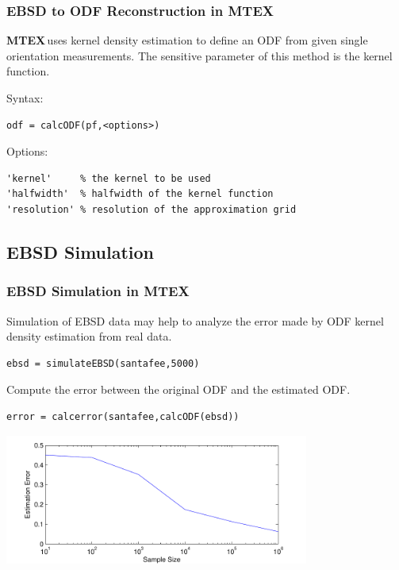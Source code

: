 \documentclass{beamer}
\newcommand{\mtex}{{\large \bf{\color{red}M}TEX\,}}%
\newcommand{\MTEX}{{\bf {\color{red}M}TEX\,}}%
\begin{document}
\begin{frame}[fragile]
  \frametitle{EBSD to ODF Reconstruction in \MTEX}

  \mtex uses kernel density estimation to define an ODF from given single
  orientation measurements. The sensitive parameter of this method is the
  kernel function.

\medskip

  Syntax:
  \begin{alertenv}
\begin{lstlisting}
odf = calcODF(pf,<options>)
\end{lstlisting}
  \end{alertenv}

Options:
\begin{lstlisting}
'kernel'     % the kernel to be used 
'halfwidth'  % halfwidth of the kernel function
'resolution' % resolution of the approximation grid
\end{lstlisting}


\end{frame}

\subsection{EBSD Simulation}

\begin{frame}[fragile]
  \frametitle{EBSD Simulation in \mtex}

  Simulation of EBSD data may help to analyze the error made by ODF kernel
  density estimation from real data.

\begin{lstlisting}
ebsd = simulateEBSD(santafee,5000) 
\end{lstlisting}      

Compute the error between the original ODF and the estimated ODF.
\begin{lstlisting}
error = calcerror(santafee,calcODF(ebsd))
\end{lstlisting}      

      \centerline{
      \includegraphics[width=10cm]{pic/ebsdcorrectness}}
 
\end{frame}
\end{document}
